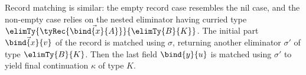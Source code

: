 Record matching is similar: the empty record case resembles the nil case, and the non-empty case relies on the nested eliminator having curried type $\elimTy{\tyRec{\vec{\bind{x}{A}}}}{\elimTy{B}{K}}$. The initial part $\vec{\bind{x}{v}}$ of the record is matched using $\sigma$, returning another eliminator $\sigma'$ of type $\elimTy{B}{K}$. Then the last field $\bind{y}{u}$ is matched using $\sigma'$ to yield final continuation $\kappa$ of type $K$.
